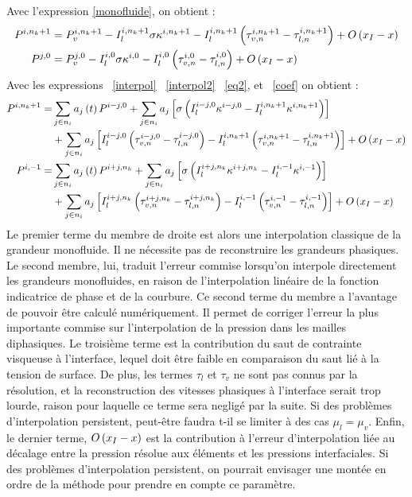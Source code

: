 Avec l'expression \eqref{monofluide}, on obtient :
\begin{align}
P^{i,n_k+1}&= P_v^{i,n_k+1}-I_l^{i, n_k+1}\sigma\kappa^{i,n_k+1}-I_l^{i, n_k+1}\left( \tau_{v,n}^{i,n_k+1}-\tau_{l,n}^{i,n_k+1}\right)+O\left( x_I-x\right)\\
P^{j,0}&= P_v^{j,0}-I_l^{i, 0}\sigma\kappa^{i,0}-I_l^{i, 0}\left( \tau_{v,n}^{i,0}-\tau_{l,n}^{i,0}\right)+O\left( x_I-x\right)\label{eq2}
\end{align}
Avec les expressions ~\eqref{interpol} ~\eqref{interpol2}  ~\eqref{eq2}, et ~\eqref{coef} on obtient :
\begin{align}
P^{i,n_k+1}=& \sum_{j\in n_{i}} a_j\left( t\right)P^{i-j,0}+ \sum_{j\in n_{i}} a_j \left[ \sigma\left( I_l^{i-j, 0}\kappa^{i-j,0}-I_l^{i, n_k+1}\kappa^{i,n_k+1}\right)\right]\nonumber\\
&+\sum_{j\in n_{i}} a_j \left[ I_l^{i-j, 0}\left( \tau_{v,n}^{i-j,0}-\tau_{l,n}^{i-j,0}\right)-I_l^{i, n_k+1}\left( \tau_{v,n}^{i, n_k+1}-\tau_{l,n}^{i, n_k+1}\right)\right]+O\left( x_I-x\right)\label{interpole_pression1}\\
P^{i,-1}= &\sum_{j\in n_{i}} a_j\left( t\right)P^{i+j,n_k}+ \sum_{j\in n_{i}} a_j\left[ \sigma\left( I_l^{i+j, n_k}\kappa^{i+j,n_k}-I_l^{i, -1}\kappa^{i,-1}\right)\right]\nonumber\\
&+\sum_{j\in n_{i}} a_j\left[ I_l^{i+j, n_k}\left( \tau_{v,n}^{i+j,n_k}-\tau_{l,n}^{i+j,n_k}\right)-I_l^{i, -1}\left( \tau_{v,n}^{i, -1}-\tau_{l,n}^{i, -1}\right)\right]+O\left( x_I-x\right)\label{interpole_pression2}
\end{align}
Le premier terme du membre de droite est alors une interpolation classique de la grandeur monofluide. Il ne nécessite pas de reconstruire les grandeurs phasiques. Le second membre, lui, traduit l'erreur commise lorsqu'on interpole directement les grandeurs monofluides, en raison de l'interpolation linéaire de la fonction indicatrice de phase et de la courbure. Ce second terme du membre a l'avantage de pouvoir être calculé numériquement. Il permet de corriger l'erreur la plus importante commise sur l'interpolation de la pression dans les mailles diphasiques. Le troisième terme est la contribution du saut de contrainte visqueuse à l'interface, lequel doit être faible en comparaison du saut lié à la tension de surface. De plus, les termes $\tau_l$ et $\tau_v$ ne sont pas connus par la résolution, et la reconstruction des vitesses phasiques à l'interface serait trop lourde, raison pour laquelle ce terme sera negligé par la suite. Si des problèmes d'interpolation persistent, peut-être faudra t-il se limiter à des cas $\mu_l=\mu_v$. Enfin, le dernier terme, $O\left( x_I-x\right)$ est la contribution à l'erreur d'interpolation liée au décalage entre la pression résolue aux éléments et les pressions interfaciales. Si des problèmes d'interpolation persistent, on pourrait envisager une montée en ordre de la méthode pour prendre en compte ce paramètre. 

